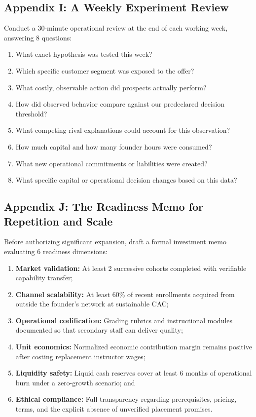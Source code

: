 \subsection*{Appendix I: A Weekly Experiment Review}

Conduct a 30-minute operational review at the end of each working week, answering 8 questions:
\begin{enumerate}
    \item What exact hypothesis was tested this week?
    \item Which specific customer segment was exposed to the offer?
    \item What costly, observable action did prospects actually perform?
    \item How did observed behavior compare against our predeclared decision threshold?
    \item What competing rival explanations could account for this observation?
    \item How much capital and how many founder hours were consumed?
    \item What new operational commitments or liabilities were created?
    \item What specific capital or operational decision changes based on this data?
\end{enumerate}

\subsection*{Appendix J: The Readiness Memo for Repetition and Scale}

Before authorizing significant expansion, draft a formal investment memo evaluating 6 readiness dimensions:
\begin{enumerate}
    \item \textbf{Market validation:} At least 2 successive cohorts completed with verifiable capability transfer;
    \item \textbf{Channel scalability:} At least 60\% of recent enrollments acquired from outside the founder's network at sustainable CAC;
    \item \textbf{Operational codification:} Grading rubrics and instructional modules documented so that secondary staff can deliver quality;
    \item \textbf{Unit economics:} Normalized economic contribution margin remains positive after costing replacement instructor wages;
    \item \textbf{Liquidity safety:} Liquid cash reserves cover at least 6 months of operational burn under a zero-growth scenario; and
    \item \textbf{Ethical compliance:} Full transparency regarding prerequisites, pricing, terms, and the explicit absence of unverified placement promises.
\end{enumerate}

